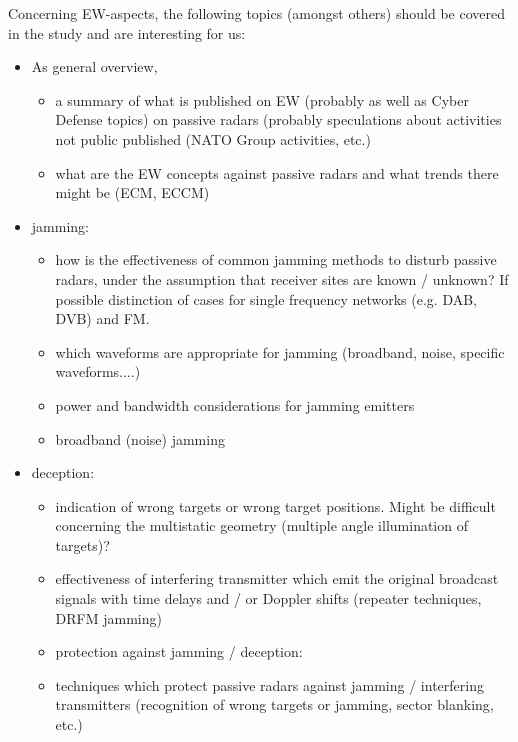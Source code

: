 \documentclass[english, 12pt]{report}
\begin{document}
Concerning EW-aspects, the following topics (amongst others) should be covered in the study and are interesting for us:
\begin{itemize}
\item As general overview,


\begin{itemize}
\item a summary of what is published on EW (probably as well as Cyber Defense topics) on passive radars (probably speculations about activities not public published (NATO Group activities, etc.)
\item what are the EW concepts against passive radars and what trends there might be (ECM, ECCM)
\end{itemize}

\item jamming:

\begin{itemize}
\item how is the effectiveness of common jamming methods to disturb passive radars, under the assumption that receiver sites are known / unknown? If possible distinction of cases for single frequency networks (e.g. DAB, DVB) and FM.
\item which waveforms are appropriate for jamming (broadband, noise, specific waveforms....)
\item power and bandwidth considerations for jamming emitters
\item broadband (noise) jamming

\end{itemize}

\item deception:

\begin{itemize}
\item indication of wrong targets or wrong target positions. Might be difficult concerning the multistatic geometry (multiple angle illumination of targets)?
\item effectiveness of interfering transmitter which emit the original broadcast signals with time delays and / or Doppler shifts (repeater techniques, DRFM jamming)
\item protection against jamming / deception:
\item techniques which protect passive radars against jamming / interfering transmitters (recognition of wrong targets or jamming, sector blanking, etc.)
\end{itemize}



\end{itemize}

\label{lastpg}
\end{document}
